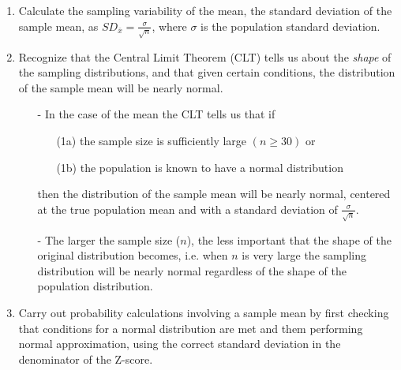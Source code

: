 \documentclass[11pt]{article}
\begin{document}
%

\vspace{0.48cm}
\begin{enumerate}[resume]
\renewcommand\labelenumi{\textcolor{oiB}{\textbf{LO \theenumi.}}}
\item Calculate the sampling variability of the mean, the standard deviation of the sample mean, as $SD_{\bar{x}} = \frac{\sigma}{\sqrt{n}}$, where $\sigma$ is the population standard deviation.

\item Recognize that the Central Limit Theorem (CLT) tells us about the \textit{shape} of the sampling distributions, and that given certain conditions, the distribution of the sample mean will be nearly normal.
\begin{itemize}
\item[-] In the case of the mean the CLT tells us that if
\begin{itemize}[parsep=0pt]
\item[(1a)] the sample size is sufficiently large $(n \ge 30)$ or
\item[(1b)] the population is known to have a normal distribution
\end{itemize}
then the distribution of the sample mean will be nearly normal, centered at the true population mean and with a standard deviation of $\frac{\sigma}{\sqrt{n}}$.
\item[-] The larger the sample size ($n$), the less important that the shape of the original distribution becomes, i.e. when $n$ is very large the sampling distribution will be nearly normal regardless of the shape of the population distribution.
\end{itemize}
\item Carry out probability calculations involving a sample mean by first checking that conditions for a normal distribution are met and them performing normal approximation, using the correct standard deviation in the denominator of the Z-score.
\end{enumerate}
\end{document}
